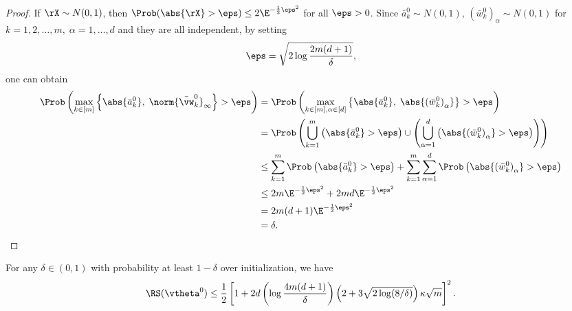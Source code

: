 \documentclass{article}
\begin{document}
\begin{proof}
    If $\rX \sim N(0, 1)$, then $\Prob(\abs{\rX} > \eps) \leq 2\E^{-\frac{1}{2}\eps^2}$ for all $\eps > 0$. Since $\bar{a}^0_k\sim N(0,1)$, ${(\bar{w}_k^0)}_{\alpha}\sim N(0,1)$ for $k=1, 2, \ldots, m,\; \alpha =1,\ldots,d$ and they are all independent, by setting
    \begin{equation}
        \eps = \sqrt{2\log\frac{2m(d+1)}{\delta}},
    \end{equation}
    one can obtain
    \begin{equation}
        \begin{aligned}
            \Prob\left(\max\limits_{k\in[m]}\left\{\abs{\bar{a}_k^0},\; \norm{\bar{\vw}_k^0}_{\infty}\right \}>\eps\right)
             & = \Prob\left(\max\limits_{k\in[m],\alpha\in[d]}\left\{\abs{\bar{a}_k^0},\; \abs{{(\bar{w}^0_k)}_{\alpha}}\right \}>\eps\right)                                            \\
             & = \Prob\left(\bigcup\limits_{k=1}^m\left(\abs{\bar{a}_k^0}>\eps\right)\cup\left(\bigcup\limits_{\alpha=1}^d\left(\abs{{(\bar{w}_k^0)}_{\alpha}}>\eps\right)\right)\right) \\
             & \leq \sum_{k=1}^m \Prob\left(\abs{\bar{a}_k^0}>\eps\right) + \sum_{k=1}^m\sum_{\alpha=1}^d \Prob\left(\abs{{(\bar{w}^0_k)}_{\alpha}}>\eps\right)                          \\
             & \leq 2m \E^{-\frac{1}{2}\eps^2} + 2md \E^{-\frac{1}{2}\eps^2}                                                                                                             \\
             & = 2m(d+1)\E^{-\frac{1}{2}\eps^2}                                                                                                                                          \\
             & = \delta.
        \end{aligned}
    \end{equation}
\end{proof}
\begin{lem}
    For any $\delta\in(0,1)$ with probability at least $1-\delta$ over initialization, we have
    \begin{equation}
        \RS(\vtheta^0)\leq\frac{1}{2}\left[1 + 2d\left(\log\frac{4m(d+1)}{\delta}\right)\left(2+3\sqrt{2\log(8/\delta)}\right)\kappa\sqrt{m}\right]^2.
    \end{equation}
\end{lem}
\end{document}
